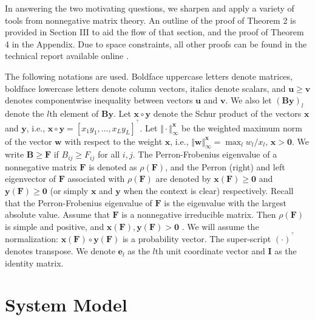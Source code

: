 \documentclass[10pt,twocolumn]{IEEEtran}
\newcommand{\x}{\mathbf{x}}
\newcommand{\y}{\mathbf{y}}
\newcommand{\0}{\mathbf{0}}
\newcommand{\1}{\mathbf{1}}
\newcommand{\trans}{^\top}
\begin{document}
In answering the two motivating questions, we sharpen and apply a variety of tools from nonnegative matrix theory. An outline of the proof of Theorem 2 is provided in Section III to aid the flow of that section, and the proof of Theorem 4 in the Appendix. Due to space constraints, all other proofs can be found in the technical report available online \cite{Tan09atech}.

The following notations are used. Boldface uppercase letters denote
matrices, boldface lowercase letters denote column vectors,
italics denote scalars, and $\mathbf{u} \ge \mathbf{v}$
denotes componentwise inequality between vectors $\mathbf{u}$ and
$\mathbf{v}$. We also let $(\mathbf{B}\mathbf{y})_l$ denote the $l$th element of $\mathbf{B}\mathbf{y}$. Let $\mathbf{x} \circ \mathbf{y}$ denote the Schur product of the vectors $\mathbf{x}$ and $\mathbf{y}$, i.e., $\mathbf{x} \circ \mathbf{y}=[x_1 y_1, \dots, x_L y_L]^{\trans}$.
Let $\Vert \cdot \Vert^{\mathbf{x}}_{\infty}$ be the weighted maximum norm of the vector $\mathbf{w}$ with respect to the weight $\mathbf{x}$, i.e., $\Vert \mathbf{w} \Vert^{\mathbf{x}}_{\infty}=\max_l w_l /x_l$, $\mathbf{x} > \mathbf{0}$. We write $\mathbf{B} \ge \mathbf{F}$ if $B_{ij} \ge F_{ij}$ for all $i,j$. The Perron-Frobenius eigenvalue of a nonnegative matrix $\mathbf{F}$ is denoted as $\rho(\mathbf{F})$, and the Perron (right) and left eigenvector of $\mathbf{F}$ associated with $\rho(\mathbf{F})$ are denoted by $\mathbf{x}(\mathbf{F}) \ge \mathbf{0}$ and $\mathbf{y}(\mathbf{F}) \ge \mathbf{0}$ (or simply $\mathbf{x}$ and $\mathbf{y}$ when the context is clear) respectively. Recall that the Perron-Frobenius eigenvalue of $\mathbf{F}$ is the eigenvalue with the largest absolute value. Assume that $\mathbf{F}$ is a nonnegative irreducible matrix.  Then $\rho(\mathbf{F})$ is simple and positive, and $\x(\mathbf{F}),\y(\mathbf{F}) > \0$ \cite{Berman79}. We will assume the normalization: $\x(\mathbf{F})\circ\y(\mathbf{F})$ is a probability vector. The super-script $(\cdot)^{\trans}$ denotes transpose. We denote $\mathbf{e}_l$ as the $l$th unit coordinate vector and $\mathbf{I}$ as the identity matrix. 

\section{System Model}
\label{sysmodel}
\end{document}
